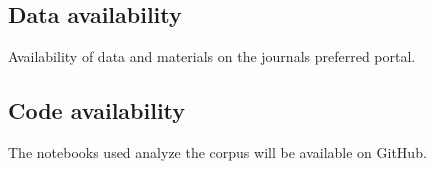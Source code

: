 \documentclass[sn-mathphys,Numbered]{sn-jnl}%
\theoremstyle{thmstyleone}%
\theoremstyle{thmstyletwo}%
\theoremstyle{thmstylethree}%
\begin{document}
\subsection*{Data availability}
%
Availability of data and materials on the journals preferred portal.
%
%
%
\subsection*{Code availability}
%
The notebooks used analyze the corpus will be available on GitHub.
%
%
%
%
%
%
%
%
%
%
%
%
%
%
%


\end{document}
